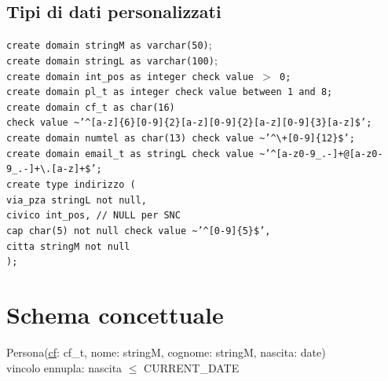 \documentclass[a4paper,12pt]{report}
\begin{document}
      \newpage

      \section{Tipi di dati personalizzati}
        \texttt{create domain stringM as varchar(50)}; \\
        \texttt{create domain stringL as varchar(100)}; \\
        \texttt{create domain int\_pos as integer check value $>$ 0;} \\
        \texttt{create domain pl\_t as integer check value between 1 and 8;} \\
        \texttt{create domain cf\_t as char(16) \\
        \hspace*{1cm}check value \textasciitilde * '\textasciicircum[a-z]\{6\}[0-9]\{2\}[a-z][0-9]\{2\}[a-z][0-9]\{3\}[a-z]\$';} \\
        \texttt{create domain numtel as char(13) check value \textasciitilde * '\textasciicircum\textbackslash+[0-9]\{12\}\$';} \\
        \texttt{create domain email\_t as stringL check value \textasciitilde * '\textasciicircum[a-z0-9\_.-]+@[a-z0-9\_.-]+\textbackslash.[a-z]+\$';} \\
        \texttt{create type indirizzo ( \\
        \hspace*{1cm}via\_pza stringL not null, \\
        \hspace*{1cm}civico int\_pos, \hspace*{1cm} // NULL per SNC \\
        \hspace*{1cm}cap char(5) not null check value \textasciitilde * '\textasciicircum[0-9]\{5\}\$', \\
        \hspace*{1cm}citta stringM not null \\
        );} \\

    \chapter{Schema concettuale}
      Persona(\underline{cf}: cf\_t, nome: stringM, cognome: stringM, nascita: date) \\
      \hspace*{1cm}vincolo ennupla: nascita $\leq$ CURRENT\_DATE \\
\end{document}
